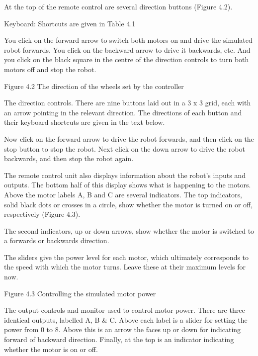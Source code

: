 \documentclass[letterpaper,10pt,english]{sphinxmanual}
\begin{document}
At the top of the remote control are several direction buttons (Figure 4.2).





Keyboard: Shortcuts are given in Table 4.1





You click on the forward arrow to switch both motors on and drive the simulated robot forwards. You click on the backward arrow to drive it backwards, etc. And you click on the black square in the centre of the direction controls to turn both motors off and stop the robot.


Figure 4.2 The direction of the wheels set by the controller

The direction controls. There are nine buttons laid out in a 3 x 3 grid, each with an arrow pointing in the relevant direction. The directions of each button and their keyboard shortcuts are given in the text below.

Now click on the forward arrow to drive the robot forwards, and then click on the stop button to stop the robot. Next click on the down arrow to drive the robot backwards, and then stop the robot again.

The remote control unit also displays information about the robot’s inputs and outputs. The bottom half of this display shows what is happening to the motors. Above the motor labels A, B and C are several indicators. The top indicators, solid black dots or crosses in a circle, show whether the motor is turned on or off, respectively (Figure 4.3).

The second indicators, up or down arrows, show whether the motor is switched to a forwards or backwards direction.

The sliders give the power level for each motor, which ultimately corresponds to the speed with which the motor turns. Leave these at their maximum levels for now.


Figure 4.3 Controlling the simulated motor power

The output controls and monitor used to control motor power. There are three identical outputs, labelled A, B \& C. Above each label is a slider for setting the power from 0 to 8. Above this is an arrow the faces up or down for indicating forward of backward direction. Finally, at the top is an indicator indicating whether the motor is on or off.
\end{document}
